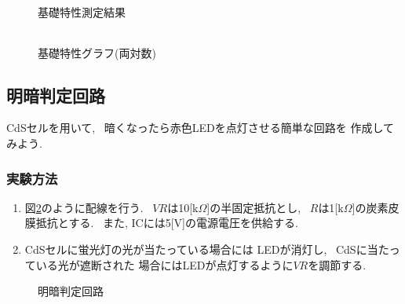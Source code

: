 \documentclass[titlepage]{jsarticle}
\begin{document}
            \begin{figure}[ht]
                \def\@captype{table}
                \begin{minipage}{0.5\hsize}
                    \begin{center}
                        \caption{基礎特性測定結果}
                        \label{tab:基礎特性結果}
                        \begin{tabular}{c|c}
                            
                        \end{tabular}
                    \end{center}
                \end{minipage}
                \begin{minipage}{0.5\hsize}
                    \begin{center}
                        \caption{基礎特性グラフ(両対数)}
                        \label{fig:基礎特性グラフ}
                    \end{center}
                \end{minipage}
            \end{figure}

    \subsection{明暗判定回路} \label{明暗判定回路}
        CdSセルを用いて, ~暗くなったら赤色LEDを点灯させる簡単な回路を
        作成してみよう.

        \subsubsection{実験方法}
            \begin{enumerate}
                \item 図\ref{fig:判定回路}のように配線を行う.
                    ~$VR$は10[k$\Omega$]の半固定抵抗とし,
                    ~$R$は1[k$\Omega$]の炭素皮膜抵抗とする.
                    ~また, ICには5[V]の電源電圧を供給する.
                \item CdSセルに蛍光灯の光が当たっている場合には
                    LEDが消灯し, ~CdSに当たっている光が遮断された
                    場合にはLEDが点灯するように$VR$を調節する.
            \end{enumerate}

            \begin{figure}[ht]
                \centering
                \caption{明暗判定回路}
                \label{fig:判定回路}
            \end{figure}
\end{document}
